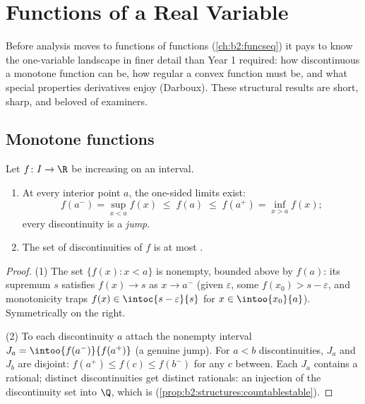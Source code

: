 \chapter{Functions of a Real Variable}\label{ch:b2:realfun}

Before analysis moves to functions of functions (\cref{ch:b2:funcseq})
it pays to know the one-variable landscape in finer detail than
Year 1 required: how discontinuous a monotone function can be, how
regular a convex function must be, and what special properties
derivatives enjoy (Darboux). These structural results are short,
sharp, and beloved of examiners.

\section{Monotone functions}

\begin{theorem}\label{thm:b2:realfun:monotone}
Let $f \colon I \to \R$ be increasing on an interval.
\begin{enumerate}
  \item At every interior point $a$, the one-sided limits exist:
        \[
        f(a^-) = \sup_{x < a} f(x) \;\leq\; f(a) \;\leq\;
        f(a^+) = \inf_{x > a} f(x) ;
        \]
        every discontinuity is a \emph{jump}.
  \item The set of discontinuities of $f$ is at most
        .
\end{enumerate}
\end{theorem}

\begin{proof}
(1) The set $\{f(x) : x < a\}$ is nonempty, bounded above by $f(a)$:
its supremum $s$ satisfies $f(x) \to s$ as $x \to a^-$ (given
$\varepsilon$, some $f(x_0) > s - \varepsilon$, and monotonicity
traps $f(x) \in \intoc{s - \varepsilon}{s}$ for $x \in
\intoo{x_0}{a}$). Symmetrically on the right.

(2) To each discontinuity $a$ attach the nonempty  interval
$J_a = \intoo{f(a^-)}{f(a^+)}$ (a genuine jump). For $a < b$
discontinuities, $J_a$ and $J_b$ are disjoint: $f(a^+) \leq f(c)
\leq f(b^-)$ for any $c$ between. Each $J_a$ contains a rational;
distinct discontinuities get distinct rationals: an injection of the
discontinuity set into $\Q$, which is 
(\cref{prop:b2:structures:countablestable}).
\end{proof}

